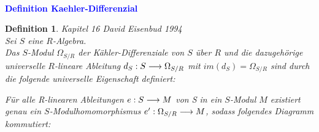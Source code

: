 \documentclass[10pt,a4paper]{report}
\newcommand{\ModulsOfDifferenzials}{David Eisenbud 1994}
\newcounter{Aussage}[chapter]
\newtheorem{definition}[Aussage]{Definition}
\newcommand{\functionfront}[3]{\nolinebreak{#1:#2 \longrightarrow #3}}
\newcommand{\divR}[2]{\Omega_{#1/#2}}
\newcommand{\divf}[1]{d_{#1}}
\newcommand{\immage}[1]{im(#1)}
\begin{document}
\ \\
\textcolor{blue}{\textbf{Definition Kaehler-Differenzial}}
\begin{definition}\label{Definition Kaehler-Differenzial} \textit{Kapitel 16 \ModulsOfDifferenzials}\\
Sei $S$ eine $R$-Algebra.\\
Das $S$-Modul $\divR{S}{R}$ der Kähler-Differenziale von $S$ über $R$ und die dazugehörige universelle $R$-lineare Ableitung $\functionfront{\divf{S}}{S}{\divR{S}{R}}$ mit $\immage{\divf{S}} = \divR{S}{R}$ sind durch die folgende universelle Eigenschaft definiert:

\begin{center}
Für alle R-linearen Ableitungen $\functionfront{e}{S}{M}$ von S in ein $S$-Modul $M$ existiert genau ein $S$-Modulhomomorphismus $\functionfront{e'}{\divR{S}{R}}{M}$, sodass folgendes Diagramm kommutiert:\\
\end{center}
\end{definition}
\end{document}
